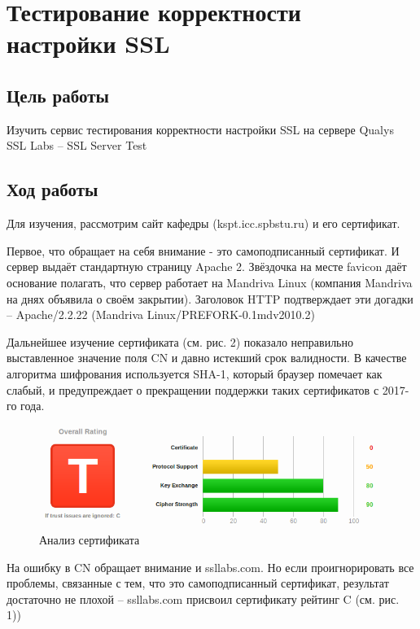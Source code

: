 \newpage
\section{Тестирование корректности настройки SSL}

\subsection{Цель работы}

Изучить сервис тестирования корректности настройки SSL на сервере Qualys SSL Labs -- SSL Server Test

\subsection{Ход работы}

Для изучения, рассмотрим сайт кафедры (kspt.icc.spbstu.ru) и его сертификат.

Первое, что обращает на себя внимание - это самоподписанный сертификат. И сервер выдаёт стандартную страницу Apache 2. Звёздочка на месте favicon даёт основание полагать, что сервер работает на Mandriva Linux (компания Mandriva на днях объявила о своём закрытии). Заголовок HTTP подтверждает эти догадки -- Apache/2.2.22 (Mandriva Linux/PREFORK-0.1mdv2010.2)

Дальнейшее изучение сертификата (см. рис. 2) показало неправильно выставленное значение поля CN и давно истекший срок валидности. В качестве алгоритма шифрования используется SHA-1, который браузер помечает как слабый, и предупреждает о прекращении поддержки таких сертификатов с 2017-го года.

\begin{figure}[h!]
\centering
\includegraphics[scale=0.8]{res/pic002}
\caption{Анализ сертификата}
\end{figure}

На ошибку в CN обращает внимание и ssllabs.com. Но если проигнорировать все проблемы, связанные с тем, что это самоподписанный сертификат, результат достаточно не плохой -- ssllabs.com присвоил сертификату рейтинг C (см. рис. 1))

